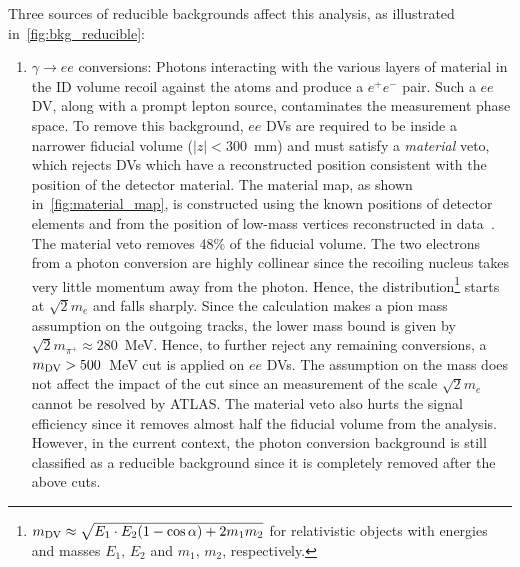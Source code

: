 Three sources of reducible backgrounds affect this analysis, as illustrated in~\cref{fig:bkg_reducible}:
\begin{enumerate}
    \item $\gamma\to ee$ conversions: Photons interacting with the various layers of material in the ID volume recoil against the atoms and produce a $e^+e^-$ pair. Such a $ee$ DV, along with a prompt lepton source, contaminates the measurement phase space. To remove this background, $ee$ DVs are required to be inside a narrower fiducial volume ($|z|<300$~mm) and must satisfy a \textit{material} veto, which rejects DVs which have a reconstructed position consistent with the position of the detector material. The material map, as shown in~\cref{fig:material_map}, is constructed using the known positions of detector elements and from the position of low-mass vertices reconstructed in data~\cite{SUSY-2018-13}. The material veto removes 48\% of the fiducial volume. The two electrons from a photon conversion are highly collinear since the recoiling nucleus takes very little momentum away from the photon. Hence, the \mdv distribution\footnote{$m_{\mathrm{DV}}\approx\sqrt{E_1\cdot E_2 (1-\cos\alpha)+2m_1m_2}$ for relativistic objects with energies and masses $E_1,\,E_2$ and $m_1,\,m_2$, respectively.} starts at $\sqrt{2}m_e$ and falls sharply. Since the \mdv calculation makes a pion mass assumption on the outgoing tracks, the lower mass bound is given by $\sqrt{2}m_{\pi^+}\approx280$~MeV. Hence, to further reject any remaining conversions, a $m_{\mathrm{DV}}>500$~MeV cut is applied on $ee$ DVs. The assumption on the mass does not affect the impact of the cut since an \mdv measurement of the scale $\sqrt{2}m_e$ cannot be resolved by ATLAS. The material veto also hurts the signal efficiency since it removes almost half the fiducial volume from the analysis. However, in the current context, the photon conversion background is still classified as a reducible background since it is completely removed after the above cuts.


\end{enumerate}
